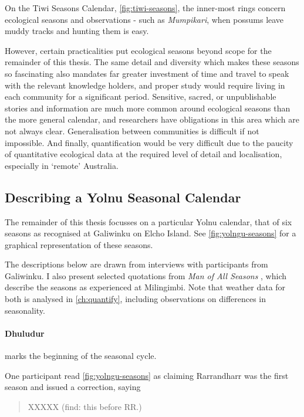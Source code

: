 On the Tiwi Seasons Calendar, \autoref{fig:tiwi-seasons}, the inner-most
rings concern ecological seasons and observations - such as
\textit{Mumpikari}, when possums leave muddy tracks and hunting them is easy.

However, certain practicalities put ecological seasons beyond scope
for the remainder of this thesis.
%
The same detail and diversity which makes these seasons so fascinating
also mandates far greater investment of time and travel to speak
with the relevant knowledge holders, and proper study would require
living in each community for a significant period.
%
Sensitive, sacred, or unpublishable stories and information are much more
common around ecological seasons than the more general calendar,
and researchers have obligations in this area which are not always clear.
%
Generalisation between communities is difficult if not impossible.
%
And finally, quantification would be very difficult due to the paucity
of quantitative ecological data at the required level of detail
and localisation, especially in `remote' Australia.





\subsection{Describing a Yolnu Seasonal Calendar}
\label{subsec:calendar-description}

The remainder of this thesis focusses on a particular Yolnu calendar,
that of six seasons as recognised at Galiwinku on Elcho Island.
See \autoref{fig:yolngu-seasons} for a graphical representation of these seasons.

The descriptions below are drawn from interviews with participants from Galiwinku.
I also present selected quotations from \textit{Man of All Seasons} \citep{davis1989},
which describe the seasons as experienced at Milingimbi.
Note that weather data for both is analysed in \autoref{ch:quantify},
including observations on differences in seasonality.


\paragraph{Dhuludur} marks the beginning of the seasonal cycle.

One participant read \autoref{fig:yolngu-seasons} as claiming Rarrandharr was the first season
and issued a correction, saying \blockquote{XXXXX (find: this before RR.)}.

